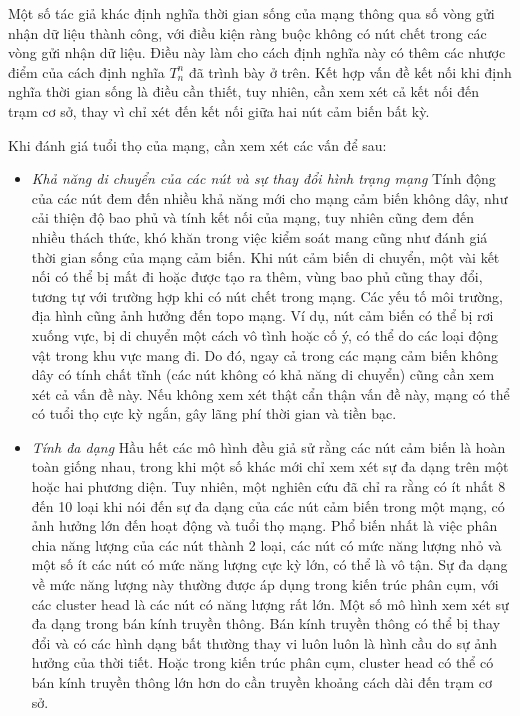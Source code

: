 \documentclass{article}
\begin{document}
\begin{itemize}
    Một số tác giả khác định nghĩa thời gian sống của mạng thông qua số vòng gửi nhận dữ liệu thành công, với điều kiện ràng buộc không có nút chết trong các vòng gửi nhận dữ liệu. Điều này làm cho cách định nghĩa này có thêm các nhược điểm của cách định nghĩa $T_n^n$ đã trình bày ở trên.
    Kết hợp vấn đề kết nối khi định nghĩa thời gian sống là điều cần thiết, tuy nhiên,  cần xem xét cả kết nối đến trạm cơ sở, thay vì chỉ xét đến kết nối giữa hai  nút cảm biến bất kỳ.
\end{itemize}
Khi đánh giá tuổi thọ của mạng, cần xem xét các vấn để sau:
\begin{itemize}
    \item \emph{Khả năng di chuyển của các nút và sự thay đổi hình trạng mạng}
\newline Tính động của các nút đem đến nhiều khả năng mới cho mạng cảm biến không dây, như cải thiện độ bao phủ và tính kết nối của mạng, tuy nhiên cũng đem đến nhiều thách thức, khó khăn trong việc kiểm soát mang cũng như đánh giá thời gian sống của mạng cảm biến. 
\newline Khi nút cảm biến di chuyển, một vài kết nối có thể bị mất đi hoặc được tạo ra thêm, vùng bao phủ cũng thay đổi, tương tự với trường hợp khi có nút chết trong mạng. Các yếu tố môi trường, địa hình cũng ảnh hưởng đến topo mạng. Ví dụ, nút cảm biến có thể bị rơi xuống vực, bị di chuyển một cách vô tình hoặc cố ý, có thể do các loại động vật trong khu vực mang đi. Do đó, ngay cả trong các mạng cảm biến không dây có tính chất tĩnh (các nút không có khả năng di chuyển) cũng cần xem xét cả vấn đề này. Nếu không xem xét thật cẩn thận vấn đề này, mạng có thể có tuổi thọ cực kỳ ngắn, gây lãng phí thời gian và tiền bạc.
\item \emph{Tính đa dạng}
\newline Hầu hết các mô hình đều giả sử rằng các nút cảm biến là hoàn toàn giống nhau, trong khi một số khác mới chỉ xem xét sự đa dạng trên một hoặc hai phương diện. Tuy nhiên, một nghiên cứu đã chỉ ra rằng có ít nhất 8 đến 10 loại khi nói đến sự đa dạng của các nút cảm biến trong một mạng, có ảnh hưởng lớn đến hoạt động và tuổi thọ mạng.
\newline Phổ biến nhất là việc phân chia năng lượng của các nút thành 2 loại, các nút có mức năng lượng nhỏ và một số ít các nút có mức năng lượng cực kỳ lớn, có thể là vô tận. Sự đa dạng về mức năng lượng này thường được áp dụng trong kiến trúc phân cụm, với các cluster head là các nút có năng lượng rất lớn.
\newline Một số mô hình xem xét sự đa dạng trong bán kính truyền thông. Bán kính truyền thông có thể bị thay đổi và có các hình dạng bất thường thay vi luôn luôn là hình cầu do sự ảnh hưởng của thời tiết. Hoặc trong kiến trúc phân cụm, cluster head có thể có bán kính truyền thông lớn hơn do cần truyền khoảng cách dài đến trạm cơ sở. 

\end{itemize}
\end{document}
